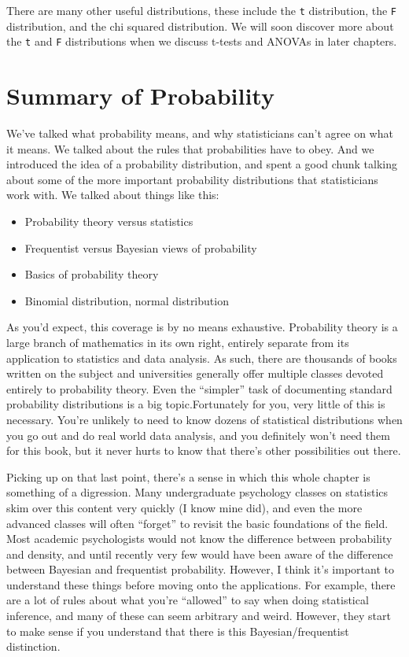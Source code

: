 \documentclass[]{book}
\begin{document}
There are many other useful distributions, these include the \texttt{t} distribution, the \texttt{F} distribution, and the chi squared distribution. We will soon discover more about the \texttt{t} and \texttt{F} distributions when we discuss t-tests and ANOVAs in later chapters.

\hypertarget{summary-of-probability}{%
\section{Summary of Probability}\label{summary-of-probability}}

We've talked what probability means, and why statisticians can't agree on what it means. We talked about the rules that probabilities have to obey. And we introduced the idea of a probability distribution, and spent a good chunk talking about some of the more important probability distributions that statisticians work with. We talked about things like this:

\begin{itemize}
\item
  Probability theory versus statistics
\item
  Frequentist versus Bayesian views of probability
\item
  Basics of probability theory
\item
  Binomial distribution, normal distribution
\end{itemize}

As you'd expect, this coverage is by no means exhaustive. Probability theory is a large branch of mathematics in its own right, entirely separate from its application to statistics and data analysis. As such, there are thousands of books written on the subject and universities generally offer multiple classes devoted entirely to probability theory. Even the ``simpler'' task of documenting standard probability distributions is a big topic.Fortunately for you, very little of this is necessary. You're unlikely to need to know dozens of statistical distributions when you go out and do real world data analysis, and you definitely won't need them for this book, but it never hurts to know that there's other possibilities out there.

Picking up on that last point, there's a sense in which this whole chapter is something of a digression. Many undergraduate psychology classes on statistics skim over this content very quickly (I know mine did), and even the more advanced classes will often ``forget'' to revisit the basic foundations of the field. Most academic psychologists would not know the difference between probability and density, and until recently very few would have been aware of the difference between Bayesian and frequentist probability. However, I think it's important to understand these things before moving onto the applications. For example, there are a lot of rules about what you're ``allowed'' to say when doing statistical inference, and many of these can seem arbitrary and weird. However, they start to make sense if you understand that there is this Bayesian/frequentist distinction.
\end{document}
